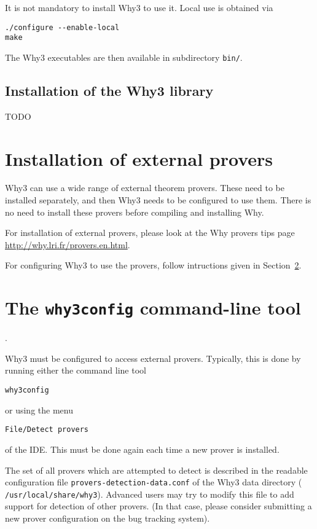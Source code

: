 It is not mandatory to install Why3 to use it. Local use is obtained via
\begin{verbatim}
./configure --enable-local
make
\end{verbatim}
The Why3 executables are then available in subdirectory \texttt{bin/}.

\subsection{Installation of the Why3 library}
\label{sec:installlib}

TODO

\section{Installation of external provers}

Why3 can use a wide range of external theorem provers. These need to
be installed separately, and then Why3 needs to be configured to use
them. There is no need to install these provers before compiling and
installing Why. 

For installation of external provers, please look at the Why provers
tips page \url{http://why.lri.fr/provers.en.html}.

For configuring Why3 to use the provers, follow intructions given in
Section~\ref{sec:why3config}.

\section{The \texttt{why3config} command-line tool}
\label{sec:why3config}.

Why3 must be configured to access external provers. Typically, this is done
by running either the command line tool
\begin{verbatim}
why3config
\end{verbatim}
or using the menu
\begin{verbatim}
File/Detect provers
\end{verbatim}
of the IDE. This must be done again each time a new prover is installed.

The set of all provers which are attempted to detect is described in
the readable configuration file \texttt{provers-detection-data.conf}
of the Why3 data directory (\eg{}
\texttt{/usr/local/share/why3}). Advanced users may try to modify this
file to add support for detection of other provers. (In that case,
please consider submitting a new prover configuration on the bug
tracking system).

